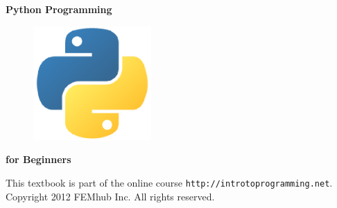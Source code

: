 \documentclass[article,A4,12pt]{llncs}
\begin{document}
\pagestyle{empty}

\vbox{}
\vspace{4cm}

\begin{center}
{\huge \bf Python Programming}
\end{center}

\begin{figure}[!ht]
\begin{center}
\vspace{-6mm}
\includegraphics[width=0.4\textwidth]{img/python-logo.png}
\vbox{}
\vspace{-9mm}
\end{center}
\end{figure}
\begin{center}
{\huge \bf for Beginners}
\end{center}
\vbox{}
\vfill
\begin{center}
This textbook is part of the online course {\tt http://introtoprogramming.net}.\\
Copyright 2012 FEMhub Inc. All rights reserved.
\end{center}
\newpage
\noindent

\newpage
\pagestyle{empty}



\normalsize

\newpage
\setcounter{tocdepth}{2}
\tableofcontents

\newpage

\pagestyle{plain}
\setcounter{page}{1}

\end{document}
